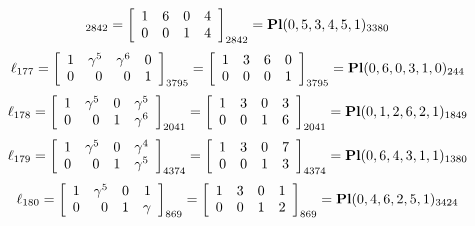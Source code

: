 \documentclass{article}
\begin{document}
{$$_{2842}
=
\left[
\begin{array}{*{4}c}
1  & 6  & 0  & 4\\
0  & 0  & 1  & 4\\
\end{array}
\right]_{2842}
={\rm\bf Pl}(0,5,3,4,5,1 )_{3380}$$
$$
\ell_{177} = 
\left[
\begin{array}{*{4}{r}}
1 & \gamma^{5} & \gamma^{6} & 0\\
0 & 0 & 0 & 1\\
\end{array}
\right]
_{3795}
=
\left[
\begin{array}{*{4}c}
1  & 3  & 6  & 0\\
0  & 0  & 0  & 1\\
\end{array}
\right]_{3795}
={\rm\bf Pl}(0,6,0,3,1,0 )_{244}$$
$$
\ell_{178} = 
\left[
\begin{array}{*{4}{r}}
1 & \gamma^{5} & 0 & \gamma^{5}\\
0 & 0 & 1 & \gamma^{6}\\
\end{array}
\right]
_{2041}
=
\left[
\begin{array}{*{4}c}
1  & 3  & 0  & 3\\
0  & 0  & 1  & 6\\
\end{array}
\right]_{2041}
={\rm\bf Pl}(0,1,2,6,2,1 )_{1849}$$
$$
\ell_{179} = 
\left[
\begin{array}{*{4}{r}}
1 & \gamma^{5} & 0 & \gamma^{4}\\
0 & 0 & 1 & \gamma^{5}\\
\end{array}
\right]
_{4374}
=
\left[
\begin{array}{*{4}c}
1  & 3  & 0  & 7\\
0  & 0  & 1  & 3\\
\end{array}
\right]_{4374}
={\rm\bf Pl}(0,6,4,3,1,1 )_{1380}$$
$$
\ell_{180} = 
\left[
\begin{array}{*{4}{r}}
1 & \gamma^{5} & 0 & 1\\
0 & 0 & 1 & \gamma \\
\end{array}
\right]
_{869}
=
\left[
\begin{array}{*{4}c}
1  & 3  & 0  & 1\\
0  & 0  & 1  & 2\\
\end{array}
\right]_{869}
={\rm\bf Pl}(0,4,6,2,5,1 )_{3424}$$
}
\end{document}
